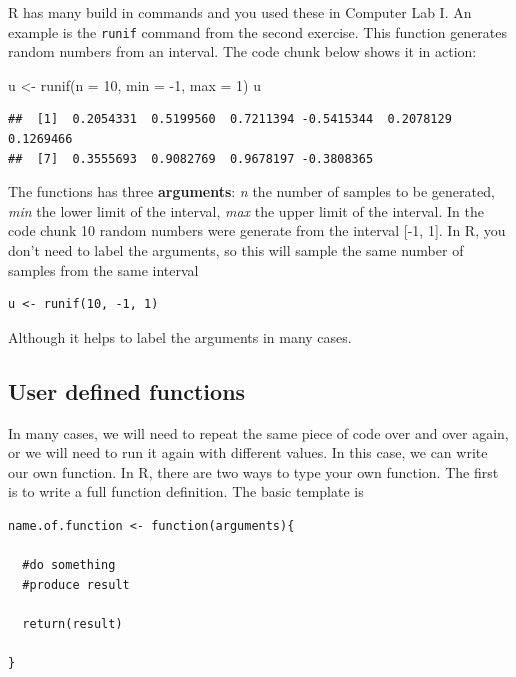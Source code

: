\documentclass[
]{book}
\newenvironment{Shaded}{\begin{snugshade}}{\end{snugshade}}
\newcommand{\AttributeTok}[1]{\textcolor[rgb]{0.77,0.63,0.00}{#1}}
\newcommand{\DecValTok}[1]{\textcolor[rgb]{0.00,0.00,0.81}{#1}}
\newcommand{\FunctionTok}[1]{\textcolor[rgb]{0.00,0.00,0.00}{#1}}
\newcommand{\NormalTok}[1]{#1}
\newcommand{\OtherTok}[1]{\textcolor[rgb]{0.56,0.35,0.01}{#1}}
\newcommand{\SpecialCharTok}[1]{\textcolor[rgb]{0.00,0.00,0.00}{#1}}
\theoremstyle{definition}
\theoremstyle{definition}
\theoremstyle{definition}
\theoremstyle{definition}
\theoremstyle{remark}
\begin{document}
R has many build in commands and you used these in Computer Lab I. An example is the \texttt{runif} command from the second exercise. This function generates random numbers from an interval. The code chunk below shows it in action:

\begin{Shaded}
\begin{Highlighting}[]
\NormalTok{u }\OtherTok{\textless{}{-}} \FunctionTok{runif}\NormalTok{(}\AttributeTok{n =} \DecValTok{10}\NormalTok{, }\AttributeTok{min =} \SpecialCharTok{{-}}\DecValTok{1}\NormalTok{, }\AttributeTok{max =} \DecValTok{1}\NormalTok{)}
\NormalTok{u}
\end{Highlighting}
\end{Shaded}

\begin{verbatim}
##  [1]  0.2054331  0.5199560  0.7211394 -0.5415344  0.2078129  0.1269466
##  [7]  0.3555693  0.9082769  0.9678197 -0.3808365
\end{verbatim}

The functions has three \textbf{arguments}: \emph{n} the number of samples to be generated, \emph{min} the lower limit of the interval, \emph{max} the upper limit of the interval. In the code chunk 10 random numbers were generate from the interval {[}-1, 1{]}. In R, you don't need to label the arguments, so this will sample the same number of samples from the same interval

\begin{verbatim}
u <- runif(10, -1, 1)
\end{verbatim}

Although it helps to label the arguments in many cases.

\hypertarget{user-defined-functions}{%
\subsection{User defined functions}\label{user-defined-functions}}

In many cases, we will need to repeat the same piece of code over and over again, or we will need to run it again with different values. In this case, we can write our own function. In R, there are two ways to type your own function. The first is to write a full function definition. The basic template is

\begin{verbatim}
name.of.function <- function(arguments){

  #do something
  #produce result
  
  return(result)

}
\end{verbatim}
\end{document}
